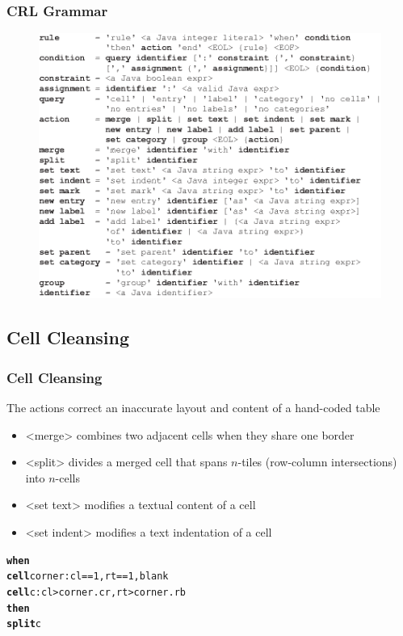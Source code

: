 \documentclass{beamer}
\begin{document}
\begin{frame}
\frametitle{CRL Grammar}

\begin{figure}
\includegraphics[width=0.75\linewidth]{bnf}
\end{figure}
\end{frame}

\subsection{Cell Cleansing}

\begin{frame}[fragile]
\frametitle{Cell Cleansing}
The actions correct an inaccurate layout and content of a hand-coded table
\begin{itemize}
	\item \alert{<merge>} combines two adjacent cells when they share one border
	\item \alert{<split>} divides a merged cell that spans $n$-tiles (row-column intersections) into $n$-cells
	\item \alert{<set text>} modifies a textual content of a cell
	\item \alert{<set indent>} modifies a text indentation of a cell
\end{itemize}

\footnotesize{
\begin{example}
\begin{alltt}
\textbf{when}
  \textbf{cell} corner: cl == 1, rt == 1, blank
  \textbf{cell} c: cl > corner.cr, rt > corner.rb
\textbf{then}
  \textbf{split} c
\end{alltt}
\end{example}
}

\end{frame}
\end{document}
